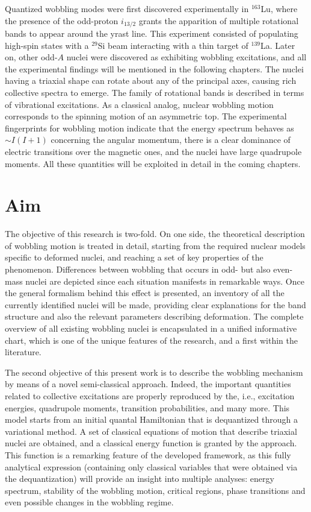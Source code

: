 Quantized wobbling modes were first discovered experimentally in $^{163}$Lu, where the presence of the odd-proton $i_{13/2}$ grants the apparition of multiple rotational bands to appear around the yrast line. This experiment consisted of populating high-spin states with a $^{29}$Si beam interacting with a thin target of $^{139}$La. Later on, other odd-$A$ nuclei were discovered as exhibiting wobbling excitations, and all the experimental findings will be mentioned in the following chapters. The nuclei having a triaxial shape can rotate about any of the principal axes, causing rich collective spectra to emerge. The family of rotational bands is described in terms of vibrational excitations. As a classical analog, nuclear wobbling motion corresponds to the spinning motion of an asymmetric top. The experimental fingerprints for wobbling motion indicate that the energy spectrum behaves as $\sim I(I+1)$ concerning the angular momentum, there is a clear dominance of electric transitions over the magnetic ones, and the nuclei have large quadrupole moments. All these quantities will be exploited in detail in the coming chapters.

\section{Aim}

The objective of this research is two-fold. On one side, the theoretical description of wobbling motion is treated in detail, starting from the required nuclear models specific to deformed nuclei, and reaching a set of key properties of the phenomenon. Differences between wobbling that occurs in odd- but also even-mass nuclei are depicted since each situation manifests in remarkable ways. Once the general formalism behind this effect is presented, an inventory of all the currently identified nuclei will be made, providing clear explanations for the band structure and also the relevant parameters describing deformation. The complete overview of all existing wobbling nuclei is encapsulated in a unified informative chart, which is one of the unique features of the research, and a first within the literature.

The second objective of this present work is to describe the wobbling mechanism by means of a novel semi-classical approach. Indeed, the important quantities related to collective excitations are properly reproduced by the, i.e., excitation energies, quadrupole moments, transition probabilities, and many more. This model starts from an initial quantal Hamiltonian that is dequantized through a variational method. A set of classical equations of motion that describe triaxial nuclei are obtained, and a classical energy function is granted by the approach. This function is a remarking feature of the developed framework, as this fully analytical expression (containing only classical variables that were obtained via the dequantization) will provide an insight into multiple analyses: energy spectrum, stability of the wobbling motion, critical regions, phase transitions and even possible changes in the wobbling regime. 

